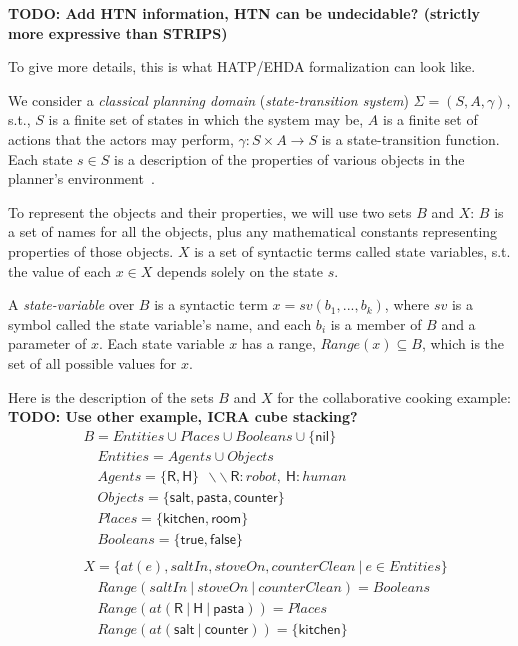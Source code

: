 \textbf{TODO: Add HTN information, HTN can be undecidable? (strictly more expressive than STRIPS)}

To give more details, this is what HATP/EHDA formalization can look like.

We consider a \textit{classical planning domain} (\textit{state-transition system}) $\Sigma = (S,A,\gamma)$, s.t., $S$ is a finite set of states in which the system may be, $A$ is a finite set of actions that the actors may perform, $\gamma : S \times A \rightarrow S$ is a state-transition function. Each state $s \in S$ is a description of the properties of various objects in the planner's environment~\cite{naubooks0014222}. 

To represent the objects and their properties, we will use two sets $B$ and $X$: $B$ is a set of names for all the objects, plus any mathematical constants representing properties of those objects. $X$ is a set of syntactic terms called state variables, s.t. the value of each $x \in X$ depends solely on the state $s$.

A \textit{state-variable} over $B$ is a syntactic term $x = sv(b_1, ..., b_k)$, where $sv$ is a symbol called the state variable's name, and each $b_i$ is a member of $B$ and a parameter of $x$. Each state variable $x$ has a range, $\textit{Range}(x) \subseteq B$, which is the set of all possible values for $x$.



Here is the description of the sets $B$ and $X$ for the collaborative cooking example:
\textbf{TODO: Use other example, ICRA cube stacking?}
{\small
\begin{align*}
&B           = Entities \cup Places \cup Booleans \cup \{\textsf{nil}\} \\
&\quad Entities    = Agents \cup Objects\\
&\quad Agents      = \{ \textsf{R}, \textsf{H} \} ~~ \backslash\backslash~\textsf{R}:robot,~\textsf{H}:human\\
&\quad Objects     = \{ \textsf{salt}, \textsf{pasta}, \textsf{counter} \}\\
&\quad Places      = \{ \textsf{kitchen}, \textsf{room} \}\\
&\quad Booleans    = \{ \textsf{true},\textsf{false} \}\\
&\\
&X = \{ at(e), saltIn, stoveOn, counterClean ~ | ~ e \in Entities \}\\
&\quad \textit{Range}(saltIn ~|~ stoveOn ~|~ counterClean)=Booleans\\
&\quad \textit{Range}(at(\textsf{R} ~|~ \textsf{H} ~|~ \textsf{pasta})) = Places\\
&\quad \textit{Range}(at(\textsf{salt} ~|~ \textsf{counter})) = \{ \textsf{kitchen} \}
\end{align*}
}

